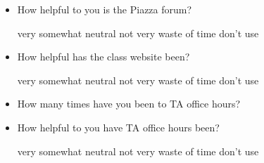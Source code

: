 \documentclass[handout]{mcs}
\begin{document}
\begin{itemize}
\begin{itemize}
\item How helpful to you is the Piazza forum?

\begin{center}
very\hspace{0.3in} somewhat \hspace{0.3in} neutral\hspace{0.3in} not
very \hspace{0.3in} waste of time  \hspace{0.7in}don't use
\end{center}





\item How helpful has the class website been?

\begin{center}
very\hspace{0.3in} somewhat \hspace{0.3in} neutral\hspace{0.3in} not
very \hspace{0.3in} waste of time  \hspace{0.7in}don't use
\end{center}

\item How many times have you been to TA office hours?\brule{0.7in}

\item How helpful to you have TA office hours been?
 
\begin{center}
very\hspace{0.3in} somewhat \hspace{0.3in} neutral\hspace{0.3in} not
very \hspace{0.3in} waste of time  \hspace{0.7in}don't use
\end{center}

\end{itemize}


\end{itemize}
\end{document}
